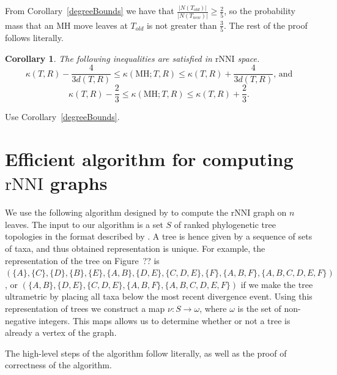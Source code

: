 \documentclass{amsart}
\newtheorem{corollary}[lemma]{Corollary}
\theoremstyle{definition}
\newcommand{\rnni}{\mathrm{rNNI}}
\newcommand{\MH}{\mathrm{MH}}
\begin{document}
\proof
From Corollary~\ref{degreeBounds} we have that $\frac{|N(T_{old})|}{|N(T_{new})|} \geq \frac{2}{5}$, so the probability mass that an MH move leaves at $T_{old}$ is not greater than $\frac35$.
The rest of the proof follows \autocite[][Proof of Lemma~V.8]{Whidden2015-es} literally.
\endproof

\begin{corollary}
The following inequalities are satisfied in $\rnni$  space.
\[
\kappa(T,R) - \dfrac{4}{3d(T,R)} \leq \kappa(\MH;T,R) \leq \kappa(T,R) +
\dfrac{4}{3d(T,R)}\mbox{, and}
\]
\[
\kappa(T,R) - \dfrac23 \leq \kappa(\MH;T,R) \leq \kappa(T,R) + \dfrac23.
\]
\end{corollary}

\proof
Use Corollary~\ref{degreeBounds}.
\endproof


\section{Efficient algorithm for computing $\rnni$ graphs}

We use the following algorithm designed by \textcite{Whidden2015-es} to compute the $\rnni$ graph on $n$ leaves.
The input to our algorithm is a set $S$ of ranked phylogenetic tree topologies in the format described by \textcite{Gavryushkin2014-bw} \autocite[see also][]{Semple2003-nj}.
A tree is hence given by a sequence of sets of taxa, and thus obtained representation is unique.
For example, the representation of the tree on Figure~??\todo{} is $(\{A\}, \{C\}, \{D\}, \{B\}, \{E\}, \{A,B\}, \{D,E\}, \{C, D, E\}, \{F\}, \{A,B,F\}, \{A,B,C,D,E,F\})$, or
$(\{A,B\}, \{D,E\}, \{C, D, E\}, \{A,B,F\}, \{A,B,C,D,E,F\})$ if we make the tree ultrametric by placing all taxa below the most recent divergence event.
Using this representation of trees we construct a map $\nu : S \to \omega$, where $\omega$ is the set of non-negative integers.
This maps allows us to determine whether or not a tree is already a vertex of the graph.

The high-level steps of the algorithm follow \textcite{Whidden2015-es} literally, as well as the proof of correctness of the algorithm.
\end{document}
